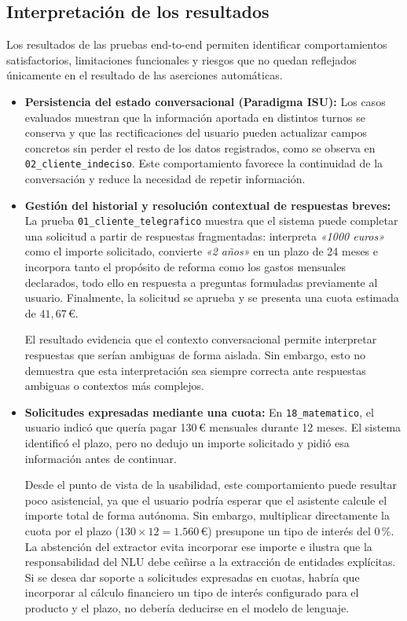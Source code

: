 \documentclass[12pt,a4paper]{report}
\begin{document}
\subsection{Interpretación de los resultados}

Los resultados de las pruebas end-to-end permiten identificar comportamientos satisfactorios, limitaciones funcionales y riesgos que no quedan reflejados únicamente en el resultado de las aserciones automáticas.

\begin{itemize}
    \item \textbf{Persistencia del estado conversacional (Paradigma ISU):}
    Los casos evaluados muestran que la información aportada en distintos turnos se conserva y que las rectificaciones del usuario pueden actualizar campos concretos sin perder el resto de los datos registrados, como se observa en \texttt{02\_cliente\_indeciso}. Este comportamiento favorece la continuidad de la conversación y reduce la necesidad de repetir información.

    \item \textbf{Gestión del historial y resolución contextual de respuestas breves:}
    La prueba \texttt{01\_cliente\_telegrafico} muestra que el sistema puede completar una solicitud a partir de respuestas fragmentadas: interpreta \textit{«1000 euros»} como el importe solicitado, convierte \textit{«2 años»} en un plazo de 24 meses e incorpora tanto el propósito de reforma como los gastos mensuales declarados, todo ello en respuesta a preguntas formuladas previamente al usuario. Finalmente, la solicitud se aprueba y se presenta una cuota estimada de $41{,}67$\,€.

    El resultado evidencia que el contexto conversacional permite interpretar respuestas que serían ambiguas de forma aislada. Sin embargo, esto no demuestra que esta interpretación sea siempre correcta ante respuestas ambiguas o contextos más complejos.

    \item \textbf{Solicitudes expresadas mediante una cuota:}
    En \texttt{18\_matematico}, el usuario indicó que quería pagar 130\,€ mensuales durante 12 meses. El sistema identificó el plazo, pero no dedujo un importe solicitado y pidió esa información antes de continuar.

    Desde el punto de vista de la usabilidad, este comportamiento puede resultar poco asistencial, ya que el usuario podría esperar que el asistente calcule el importe total de forma autónoma. Sin embargo, multiplicar directamente la cuota por el plazo ($130 \times 12 = 1.560$\,€) presupone un tipo de interés del 0\,\%. La abstención del extractor evita incorporar ese importe e ilustra que la responsabilidad del NLU debe ceñirse a la extracción de entidades explícitas. Si se desea dar soporte a solicitudes expresadas en cuotas, habría que incorporar al cálculo financiero un tipo de interés configurado para el producto y el plazo, no debería deducirse en el modelo de lenguaje.


\end{itemize}
\end{document}
